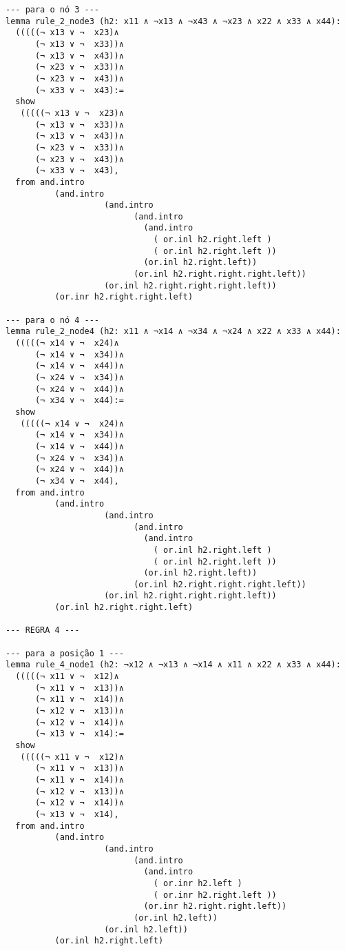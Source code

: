 \begin{lstlisting}
--- para o nó 3 ---
lemma rule_2_node3 (h2: x11 ∧ ¬x13 ∧ ¬x43 ∧ ¬x23 ∧ x22 ∧ x33 ∧ x44):
  (((((¬ x13 ∨ ¬  x23)∧
      (¬ x13 ∨ ¬  x33))∧ 
      (¬ x13 ∨ ¬  x43))∧ 
      (¬ x23 ∨ ¬  x33))∧ 
      (¬ x23 ∨ ¬  x43))∧ 
      (¬ x33 ∨ ¬  x43):=
  show
   (((((¬ x13 ∨ ¬  x23)∧
      (¬ x13 ∨ ¬  x33))∧ 
      (¬ x13 ∨ ¬  x43))∧ 
      (¬ x23 ∨ ¬  x33))∧ 
      (¬ x23 ∨ ¬  x43))∧ 
      (¬ x33 ∨ ¬  x43),
  from and.intro
          (and.intro
                    (and.intro
                          (and.intro
                            (and.intro
                              ( or.inl h2.right.left ) 
                              ( or.inl h2.right.left ))
                            (or.inl h2.right.left))
                          (or.inl h2.right.right.right.left))
                    (or.inl h2.right.right.right.left))
          (or.inr h2.right.right.left)

--- para o nó 4 ---
lemma rule_2_node4 (h2: x11 ∧ ¬x14 ∧ ¬x34 ∧ ¬x24 ∧ x22 ∧ x33 ∧ x44):
  (((((¬ x14 ∨ ¬  x24)∧
      (¬ x14 ∨ ¬  x34))∧ 
      (¬ x14 ∨ ¬  x44))∧ 
      (¬ x24 ∨ ¬  x34))∧ 
      (¬ x24 ∨ ¬  x44))∧ 
      (¬ x34 ∨ ¬  x44):=
  show
   (((((¬ x14 ∨ ¬  x24)∧
      (¬ x14 ∨ ¬  x34))∧ 
      (¬ x14 ∨ ¬  x44))∧ 
      (¬ x24 ∨ ¬  x34))∧ 
      (¬ x24 ∨ ¬  x44))∧ 
      (¬ x34 ∨ ¬  x44),
  from and.intro
          (and.intro
                    (and.intro
                          (and.intro
                            (and.intro
                              ( or.inl h2.right.left ) 
                              ( or.inl h2.right.left ))
                            (or.inl h2.right.left))
                          (or.inl h2.right.right.right.left))
                    (or.inl h2.right.right.right.left))
          (or.inl h2.right.right.left)

--- REGRA 4 ---

--- para a posição 1 ---
lemma rule_4_node1 (h2: ¬x12 ∧ ¬x13 ∧ ¬x14 ∧ x11 ∧ x22 ∧ x33 ∧ x44):
  (((((¬ x11 ∨ ¬  x12)∧
      (¬ x11 ∨ ¬  x13))∧ 
      (¬ x11 ∨ ¬  x14))∧ 
      (¬ x12 ∨ ¬  x13))∧ 
      (¬ x12 ∨ ¬  x14))∧ 
      (¬ x13 ∨ ¬  x14):=
  show
   (((((¬ x11 ∨ ¬  x12)∧
      (¬ x11 ∨ ¬  x13))∧ 
      (¬ x11 ∨ ¬  x14))∧ 
      (¬ x12 ∨ ¬  x13))∧ 
      (¬ x12 ∨ ¬  x14))∧ 
      (¬ x13 ∨ ¬  x14),
  from and.intro
          (and.intro
                    (and.intro
                          (and.intro
                            (and.intro
                              ( or.inr h2.left ) 
                              ( or.inr h2.right.left ))
                            (or.inr h2.right.right.left))
                          (or.inl h2.left))
                    (or.inl h2.left))
          (or.inl h2.right.left)


\end{lstlisting}
